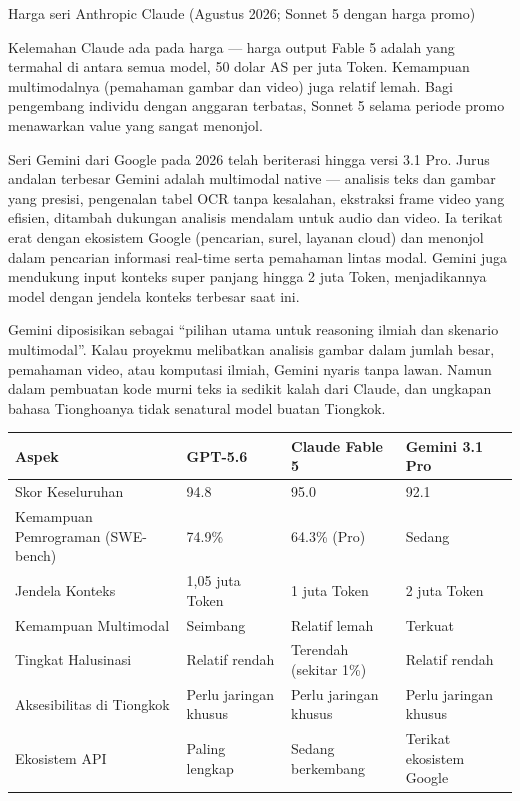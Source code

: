 \begin{center}\small\color{gray}Harga seri Anthropic Claude (Agustus 2026; Sonnet 5 dengan harga promo)\end{center}

Kelemahan Claude ada pada harga — harga output Fable 5 adalah yang termahal di antara semua model, 50 dolar AS per juta Token. Kemampuan multimodalnya (pemahaman gambar dan video) juga relatif lemah. Bagi pengembang individu dengan anggaran terbatas, Sonnet 5 selama periode promo menawarkan value yang sangat menonjol.


Seri Gemini dari Google pada 2026 telah beriterasi hingga versi 3.1 Pro. Jurus andalan terbesar Gemini adalah multimodal native — analisis teks dan gambar yang presisi, pengenalan tabel OCR tanpa kesalahan, ekstraksi frame video yang efisien, ditambah dukungan analisis mendalam untuk audio dan video. Ia terikat erat dengan ekosistem Google (pencarian, surel, layanan cloud) dan menonjol dalam pencarian informasi real-time serta pemahaman lintas modal. Gemini juga mendukung input konteks super panjang hingga 2 juta Token, menjadikannya model dengan jendela konteks terbesar saat ini.

Gemini diposisikan sebagai “pilihan utama untuk reasoning ilmiah dan skenario multimodal”. Kalau proyekmu melibatkan analisis gambar dalam jumlah besar, pemahaman video, atau komputasi ilmiah, Gemini nyaris tanpa lawan. Namun dalam pembuatan kode murni teks ia sedikit kalah dari Claude, dan ungkapan bahasa Tionghoanya tidak senatural model buatan Tiongkok.

\begin{center}
\begin{tabularx}{\linewidth}{|X|X|X|X|}
\hline
\textbf{Aspek} & \textbf{GPT-5.6} & \textbf{Claude Fable 5} & \textbf{Gemini 3.1 Pro} \tabularnewline
\hline
Skor Keseluruhan & 94.8 & 95.0 & 92.1 \tabularnewline
Kemampuan Pemrograman (SWE-bench) & 74.9\% & 64.3\% (Pro) & Sedang \tabularnewline
Jendela Konteks & 1,05 juta Token & 1 juta Token & 2 juta Token \tabularnewline
Kemampuan Multimodal & Seimbang & Relatif lemah & Terkuat \tabularnewline
Tingkat Halusinasi & Relatif rendah & Terendah (sekitar 1\%) & Relatif rendah \tabularnewline
Aksesibilitas di Tiongkok & Perlu jaringan khusus & Perlu jaringan khusus & Perlu jaringan khusus \tabularnewline
Ekosistem API & Paling lengkap & Sedang berkembang & Terikat ekosistem Google \tabularnewline
\hline
\end{tabularx}
\end{center}

